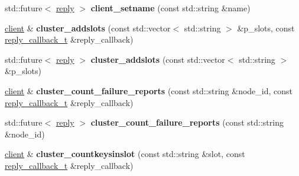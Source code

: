 \begin{DoxyCompactItemize}
\item 
\mbox{\label{classcpp__redis_1_1client_aa1ab41fda6b2536f652720b7720a0b63}} 
std\+::future$<$ \mbox{\hyperlink{classcpp__redis_1_1reply}{reply}} $>$ {\bfseries client\+\_\+setname} (const std\+::string \&name)
\item 
\mbox{\label{classcpp__redis_1_1client_ac156d5593e1800742188f0eee9016a84}} 
\mbox{\hyperlink{classcpp__redis_1_1client}{client}} \& {\bfseries cluster\+\_\+addslots} (const std\+::vector$<$ std\+::string $>$ \&p\+\_\+slots, const \mbox{\hyperlink{classcpp__redis_1_1client_af7a65eb21aa25230bfbb0b0203c4fc04}{reply\+\_\+callback\+\_\+t}} \&reply\+\_\+callback)
\item 
\mbox{\label{classcpp__redis_1_1client_a0e14578c1addf1de66745a8a95e66aeb}} 
std\+::future$<$ \mbox{\hyperlink{classcpp__redis_1_1reply}{reply}} $>$ {\bfseries cluster\+\_\+addslots} (const std\+::vector$<$ std\+::string $>$ \&p\+\_\+slots)
\item 
\mbox{\label{classcpp__redis_1_1client_a757c2a5c8e5b42ccd3930d89d739f602}} 
\mbox{\hyperlink{classcpp__redis_1_1client}{client}} \& {\bfseries cluster\+\_\+count\+\_\+failure\+\_\+reports} (const std\+::string \&node\+\_\+id, const \mbox{\hyperlink{classcpp__redis_1_1client_af7a65eb21aa25230bfbb0b0203c4fc04}{reply\+\_\+callback\+\_\+t}} \&reply\+\_\+callback)
\item 
\mbox{\label{classcpp__redis_1_1client_af1ff307eb9feb58b48b11bda78131a20}} 
std\+::future$<$ \mbox{\hyperlink{classcpp__redis_1_1reply}{reply}} $>$ {\bfseries cluster\+\_\+count\+\_\+failure\+\_\+reports} (const std\+::string \&node\+\_\+id)
\item 
\mbox{\label{classcpp__redis_1_1client_a78017860625d016074d0495c24c3f9e8}} 
\mbox{\hyperlink{classcpp__redis_1_1client}{client}} \& {\bfseries cluster\+\_\+countkeysinslot} (const std\+::string \&slot, const \mbox{\hyperlink{classcpp__redis_1_1client_af7a65eb21aa25230bfbb0b0203c4fc04}{reply\+\_\+callback\+\_\+t}} \&reply\+\_\+callback)
\item 
\mbox{\label{classcpp__redis_1_1client_a8135eee3cfc95b061aee9b6f7271efce}} 

\end{DoxyCompactItemize}
